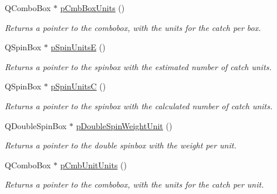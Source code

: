 \begin{DoxyCompactItemize}
QComboBox $\ast$ \hyperlink{class_catch_input_ctrl_a767ffbab2894cd923ae35b762f4fae15}{pCmbBoxUnits} ()
\begin{DoxyCompactList}\small\item\em Returns a pointer to the combobox, with the units for the catch per box. \item\end{DoxyCompactList}\item 
QSpinBox $\ast$ \hyperlink{class_catch_input_ctrl_ac7e047e40d963ca82dd71e0813127a96}{pSpinUnitsE} ()
\begin{DoxyCompactList}\small\item\em Returns a pointer to the spinbox with the estimated number of catch units. \item\end{DoxyCompactList}\item 
QSpinBox $\ast$ \hyperlink{class_catch_input_ctrl_a4b4b5a8471aa3708fd2a6f142a6e325e}{pSpinUnitsC} ()
\begin{DoxyCompactList}\small\item\em Returns a pointer to the spinbox with the calculated number of catch units. \item\end{DoxyCompactList}\item 
QDoubleSpinBox $\ast$ \hyperlink{class_catch_input_ctrl_a585254c2356f7b2f0702cf1bf737950b}{pDoubleSpinWeightUnit} ()
\begin{DoxyCompactList}\small\item\em Returns a pointer to the double spinbox with the weight per unit. \item\end{DoxyCompactList}\item 
QComboBox $\ast$ \hyperlink{class_catch_input_ctrl_aee2f7b3e7ce82dbae88bea6735cefbe3}{pCmbUnitUnits} ()
\begin{DoxyCompactList}\small\item\em Returns a pointer to the combobox, with the units for the catch per unit. \item\end{DoxyCompactList}\end{DoxyCompactItemize}
